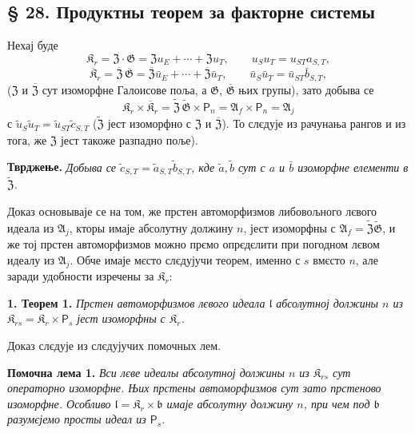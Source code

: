 \documentclass[11pt]{article}
\begin{document}
\subsection*{§ 28. Продуктны теорем за факторне системы}\label{produktsatz-fuer-faktorensysteme}

Нехај буде
\[
\mathfrak K_r=\mathfrak Z\cdot\mathfrak G
=\mathfrak Zu_E+\cdots+\mathfrak Zu_T,
\qquad u_Su_T=u_{ST}a_{S,T},
\]
\[
\overline{\mathfrak K}_r
=\overline{\mathfrak Z}\,\overline{\mathfrak G}
=\overline{\mathfrak Z}\bar u_E+\cdots+\overline{\mathfrak Z}\bar u_T,
\qquad
\bar u_S\bar u_T=\bar u_{ST}\bar b_{S,T},
\]
(\(\mathfrak Z\) и \(\overline{\mathfrak Z}\) сут изоморфне Галоисове поља, а \(\mathfrak G\), \(\overline{\mathfrak G}\) њих групы), зато добыва се
\[
\mathfrak K_r\times\overline{\mathfrak K}_r
=\widetilde{\mathfrak Z}\,\widetilde{\mathfrak G}\times \mathsf{P}_n
=\mathfrak A_f\times \mathsf{P}_n
=\mathfrak A_j
\]
с \(\tilde u_S\tilde u_T=\tilde u_{ST}\tilde c_{S,T}\) (\(\widetilde{\mathfrak Z}\) јест изоморфно с \(\mathfrak Z\) и \(\overline{\mathfrak Z}\)). То слєдује из рачунања рангов и из тога, же \(\mathfrak Z\) јест такоже разпадно поље).

\noindent\textbf{Тврджење.} \emph{Добыва се \(\tilde c_{S,T}=\tilde a_{S,T}\tilde b_{S,T}\), кде \(\tilde a,\tilde b\) сут с \(a\) и \(\bar b\) изоморфне елементи в \(\widetilde{\mathfrak Z}\).}

Доказ основываје се на том, же прстен автоморфизмов либовољного лєвого идеала из \(\mathfrak A_j\), кторы имаје абсолутну должину \(n\), јест изоморфны с \(\mathfrak A_f=\widetilde{\mathfrak Z}\widetilde{\mathfrak G}\), и же тој прстен автоморфизмов можно прємо опрєдєлити при погодном лєвом идеалу из \(\mathfrak A_j\). Обче имаје мєсто слєдујучи теорем, именно с \(s\) вмєсто \(n\), але заради удобности изречены за \(\mathfrak K_r\):

\noindent\textbf{1. Теорем 1.} \emph{Прстен автоморфизмов лєвого идеала \(\mathfrak l\) абсолутној должины \(n\) из \(\mathfrak K_{rs}=\mathfrak K_r\times \mathsf{P}_s\) јест изоморфны с \(\mathfrak K_r\).}

Доказ слєдује из слєдујучих помочных лем.

\noindent\textbf{Помочна лема 1.} \emph{Вси лєве идеалы абсолутној должины \(n\) из \(\mathfrak K_{rs}\) сут операторно изоморфне. Њих прстены автоморфизмов сут зато прстеново изоморфне. Особливо \(\mathfrak l=\mathfrak K_r\times\mathfrak b\) имаје абсолутну должину \(n\), при чем под \(\mathfrak b\) разумєјемо просты идеал из \(\mathsf{P}_s\).}
\end{document}
